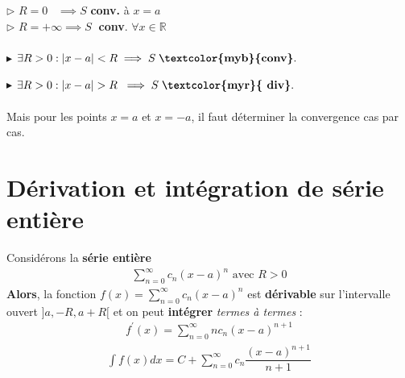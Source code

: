 \documentclass{report}
\begin{document}
\begin{multicols*}{3}
            \noindent$\rhd$
                $R = 0 \;\;\; \implies S$ \; 
                \textcolor{myb}{\textbf{conv.}}  à $x = a$ 
            \\
            $\rhd$  $R = +\infty \implies S \;$ 
            \textcolor{myb}{\textbf{conv}}. 
            \; $\forall x \in \mathbb{R}$  
            \\ \\
            $\blacktriangleright$ 
            $\exists R > 0 : |x - a| < R \implies  S \; \textbf{\textcolor{myb}{conv}}.$

            \noindent 
            $\blacktriangleright$ $\exists R > 0 : |x - a| > R \; \implies  S \;
            \textbf{\textcolor{myr}{ div}}.$   
            \\\\ 
            Mais pour les points $x = a$ et $x = -a$, il faut déterminer  
            la convergence cas par cas. 


    \vspace{-1em}
    \section{Dérivation et intégration de série entière}
    \vspace{-2em}
        Considérons la \textbf{série entière} 
        \begin{align*}
            \sum\limits_{n = 0}^{\infty}c_n(x - a)^n \text{ avec } R > 0
        \end{align*}                
        \textbf{Alors}, la fonction $f(x) =  \sum_{n=0}^{\infty }c_n(x - a)^n$ 
        est \textbf{\textcolor{myb}{dérivable}} 
        sur l'intervalle ouvert $]a, -R, a + R[$ et on peut 
        \textcolor{myb}{\textbf{intégrer}}    \textit{termes à termes} :  
        \begin{align*}
            f^{\prime}(x) = \sum_{n=0}^{\infty }nc_n(x - a)^{n + 1}
        \end{align*}
        \vspace{-1em} 
        \begin{align*}
            \int f(x)dx  = C + \sum_{n=0}^{\infty }c_n
            \dfrac{(x - a)^{n+1}}{n+1} 
        \end{align*}    




\end{multicols*}
\end{document}
